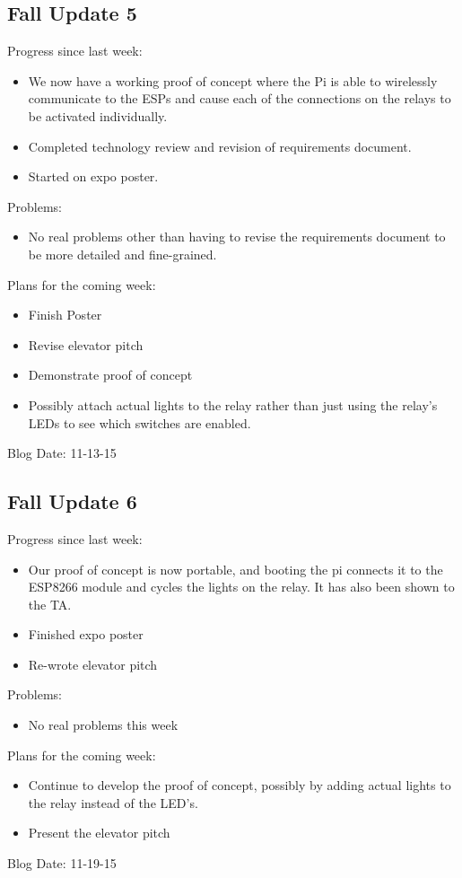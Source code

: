 \subsection{Fall Update 5}
Progress since last week:
\begin{itemize}
   \item We now have a working proof of concept where the Pi is able to wirelessly communicate to the ESPs and cause each of the connections on the relays to be activated individually.
   \item Completed technology review and revision of requirements document.
   \item Started on expo poster.
\end{itemize}
Problems:
\begin{itemize}
   \item No real problems other than having to revise the requirements document to be more detailed and fine-grained.
\end{itemize}
Plans for the coming week:
\begin{itemize}
   \item Finish Poster
   \item Revise elevator pitch
   \item Demonstrate proof of concept
   \item Possibly attach actual lights to the relay rather than just using the relay's LEDs to see which switches are enabled.
\end{itemize}
Blog Date: 11-13-15

\subsection{Fall Update 6}
Progress since last week:
\begin{itemize}
   \item Our proof of concept is now portable, and booting the pi connects it to the ESP8266 module and cycles the lights on the relay.​ It has also been shown to the TA.
   \item Finished expo poster
   \item Re-wrote elevator pitch
\end{itemize}
Problems:
\begin{itemize}
   \item No real problems this week
\end{itemize}
Plans for the coming week:
\begin{itemize}
   \item Continue to develop the proof of concept, possibly by adding actual lights to the relay instead of the LED's.
   \item Present the elevator pitch​
\end{itemize}
Blog Date: 11-19-15

